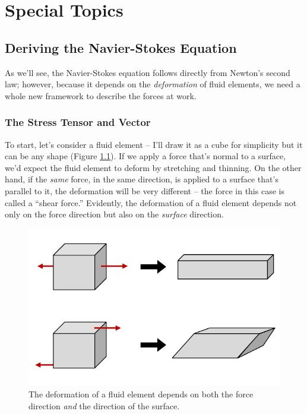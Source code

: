 \chapter{Special Topics}

%
%

\section{Deriving the Navier-Stokes Equation}
\label{sec_ns_deriv}

As we'll see, the Navier-Stokes equation follows directly from Newton's second law; however, because it depends on the \emph{deformation} of fluid elements, we need a whole new framework to describe the forces at work. 

\subsection{The Stress Tensor and Vector}
\label{sec_stress}

To start, let's consider a fluid element -- I'll draw it as a cube for simplicity but it can be any shape (Figure \ref{fig_deform}).  If we apply a force that's normal to a surface, we'd expect the fluid element to deform by stretching and thinning.  On the other hand, if the \emph{same} force, in the same direction, is applied to a surface that's parallel to it, the deformation will be very different -- the force in this case is called a ``shear force.''  Evidently, the deformation of a fluid element depends not only on the force direction but also on the \emph{surface} direction. 

\begin{figure}
\centering
\includegraphics[width=0.9\linewidth]{Figures/Chapter2/fig_deform}
\caption{The deformation of a fluid element depends on both the force direction \emph{and} the direction of the surface. }
\label{fig_deform}
\end{figure}

